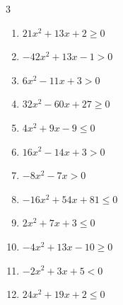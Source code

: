 \begin{multicols}{3}
\begin{enumerate}
  \item $21x^{2}+13x+2\geq 0$


\columnbreak %

  \item $-42x^{2}+13x-1>0$


  \item $6x^{2}-11x+3>0$


  \item $32x^{2}-60x+27\geq 0$


  \item $4x^{2}+9x-9\leq 0$


  \item $16x^{2}-14x+3>0$


  \item $-8x^{2}-7x>0$


  \item $-16x^{2}+54x+81\leq 0$


  \item $2x^{2}+7x+3\leq 0$


  \item $-4x^{2}+13x-10\geq 0$


  \item $-2x^{2}+3x+5<0$


\columnbreak %

  \item $24x^{2}+19x+2\leq 0$


\end{enumerate}
\end{multicols}
